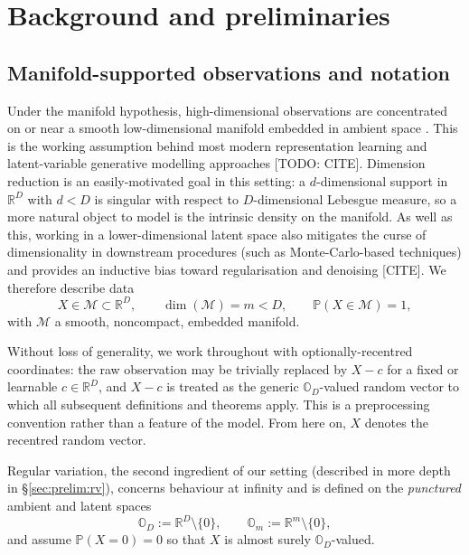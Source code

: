 \documentclass{article}
\theoremstyle{definition}
\newcommand{\cM}{\mathcal{M}}
\begin{document}
\section{Background and preliminaries}
\label{sec:prelim}

\subsection{Manifold-supported observations and notation}
\label{sec:prelim:notation}

Under the manifold hypothesis, high-dimensional observations are concentrated on or near a smooth low-dimensional manifold embedded in ambient space \cite{Cayton_2008,Whiteley_2025}. This is the working assumption behind most modern representation learning and latent-variable generative modelling approaches [TODO: CITE]. Dimension reduction is an easily-motivated goal in this setting: a \(d\)-dimensional support in \(\mathbb{R}^D\) with \(d<D\) is singular with respect to \(D\)-dimensional Lebesgue measure, so a more natural object to model is the intrinsic density on the manifold. As well as this, working in a lower-dimensional latent space also mitigates the curse of dimensionality in downstream procedures (such as Monte-Carlo-based techniques) and provides an inductive bias toward regularisation and denoising [CITE]. We therefore describe data
\[
X \in \cM \subset \mathbb{R}^D,
\qquad
\dim(\cM) = m < D,
\qquad
\mathbb{P}(X \in \cM) = 1,
\]
with \(\cM\) a smooth, noncompact, embedded manifold.

Without loss of generality, we work throughout with optionally-recentred coordinates: the raw observation may be trivially replaced by \(X-c\) for a fixed or learnable \(c\in\mathbb{R}^D\), and \(X-c\) is treated as the generic \(\mathbb{O}_D\)-valued random vector to which all subsequent definitions and theorems apply. This is a preprocessing convention rather than a feature of the model. From here on, \(X\) denotes the recentred random vector.

Regular variation, the second ingredient of our setting (described in more depth in \S\ref{sec:prelim:rv}), concerns behaviour at infinity and is defined on the \emph{punctured} ambient and latent spaces
\[
\mathbb{O}_D := \mathbb{R}^D \setminus \{0\},
\qquad
\mathbb{O}_m := \mathbb{R}^m \setminus \{0\},
\]
and assume \(\mathbb{P}(X=0)=0\) so that \(X\) is almost surely \(\mathbb{O}_D\)-valued.
\end{document}
